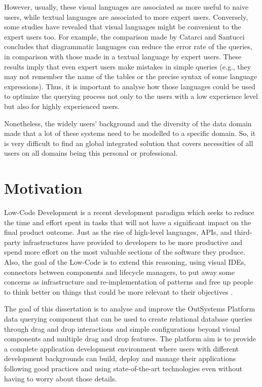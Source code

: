 However, usually, these visual languages are associated as more useful to naive users, while textual languages are associated to more expert users.  Conversely, some studies have revealed that visual languages might be convenient to the expert users too. For example, the comparison made by Catarci and Santucci \cite{diagrammaticVsTextualQueryLanguages_aComparativeExperiment} concludes that diagrammatic languages can reduce the error rate of the queries, in comparison with those made in a textual language by expert users. These results imply that even expert users make mistakes in simple queries (e.g., they may not remember the name of the tables or the precise syntax of some language expressions). Thus, it is important to analyse how those languages could be used to optimize the querying process not only to the users with a low experience level but also for highly experienced users.

 Nonetheless, the widely users’ background and the diversity of the data domain made that a lot of these systems need to be modelled to a specific domain. So, it is very difficult to find an global integrated solution that covers necessities of all users on all domains being this personal or professional.

\section{Motivation}
\label{sec:motivation}

Low-Code Development is a recent development paradigm which seeks to reduce the time and effort spent in tasks that will not have a significant impact on the final product outcome. Just as the rise of high-level languages, APIs, and third-party infrastructures have provided to developers to be more productive and spend more effort on the most valuable sections of the software they produce. Also, the goal of the Low-Code is to extend this reasoning, using visual IDEs, connectors between components and lifecycle managers, to put away some concerns as infrastructure and re-implementation of patterns and free up people to think better on things that could be more relevant to their objectives \cite{outsystems_whatIsLowCode}.

The goal of this dissertation is to analyse and improve the OutSystems Platform \cite{outsystemsPlatform} data querying component that can be used to create relational database queries through drag and drop interactions and simple configurations beyond visual components and multiple drag and drop features. The platform aim is to provide a complete application development environment where users with different development backgrounds can build, deploy and manage their applications following good practices and using state-of-the-art technologies even without having to worry about those details.


